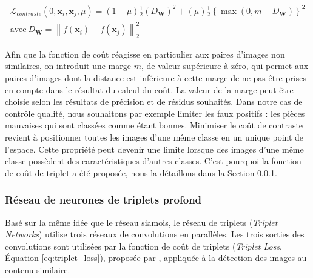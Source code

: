 \begin{equation} \label{eq:contrastive_loss}
\begin{split}
\mathcal{L}_{contraste}(0, \mathbf{x}_i, \mathbf{x}_j, \mu) = (1-\mu) \frac{1}{2}\left(D_{\mathbf{W}}\right)^{2}+(\mu) \frac{1}{2}\left\{\max \left(0, m-D_{\mathbf{W}}\right)\right\}^{2}
\\
\text{avec} \ D_{\mathbf{W}} = \left\|f(\mathbf{x}_i) - f(\mathbf{x}_j)\right\|^{2}_{2}
\end{split}
\end{equation}

Afin que la fonction de coût réagisse en particulier aux paires d'images non similaires, on introduit une marge $m$, de valeur supérieure à zéro, qui permet aux paires d'images dont la distance est inférieure à cette marge de ne pas être prises en compte dans le résultat du calcul du coût.
La valeur de la marge peut être choisie selon les résultats de précision et de résidus souhaités.
Dans notre cas de contrôle qualité, nous souhaitons par exemple limiter les faux positifs : les pièces mauvaises qui sont classées comme étant bonnes.
Minimiser le coût de contraste revient à positionner toutes les images d'une même classe en un unique point de l'espace.
Cette propriété peut devenir une limite lorsque des images d'une même classe possèdent des caractéristiques d'autres classes.
C'est pourquoi la fonction de coût de triplet a été proposée, nous la détaillons dans la Section \ref{subsubsec:triplet}.


\subsubsection{Réseau de neurones de triplets profond} \label{subsubsec:triplet}
Basé sur la même idée que le réseau siamois, le réseau de triplets (\textit{Triplet Networks}) utilise trois réseaux de convolutions en parallèles.
Les trois sorties des convolutions sont utilisées par la fonction de coût de triplets (\textit{Triplet Loss}, Équation \ref{eq:triplet_loss}), proposée par \cite{wang_learning_2014}, appliquée à la détection des images au contenu similaire.

